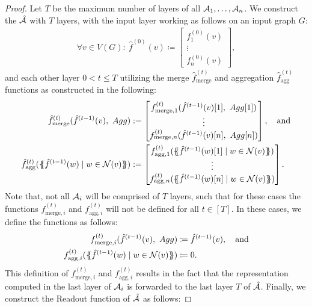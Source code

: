 \begin{proof}
    Let $T$ be the maximum number of layers of all $\mathcal{A}_1, \dots, \mathcal{A}_n$. We construct the \gnn $\hat{\mathcal{A}}$ with $T$ layers, with the input layer working as follows on an input graph $G$:
    \begin{align*}
        \forall v \in V(G): \ \hat{f}^{(0)}(v) \coloneqq \begin{bmatrix}
            f^{(0)}_1(v)\\
            \vdots\\
            f^{(0)}_n(v)
        \end{bmatrix},
    \end{align*}
    and each other layer $0 < t \leq T$ utilizing the merge $\hat{f}^{(t)}_{\text{merge}}$ and aggregation $\hat{f}^{(t)}_{\text{agg}}$ functions as constructed in the following:
    \begin{align*}
        \hat{f}^{(t)}_{\text{merge}} (\hat{f}^{(t-1)}(v), \ Agg) &:= \begin{bmatrix}
            f^{(t)}_{\text{merge}, 1}(\hat{f}^{(t-1)}(v)[1],\ Agg[1])\\
            \vdots\\
            f^{(t)}_{\text{merge}, n}(\hat{f}^{(t-1)}(v)[n],\ Agg[n])
        \end{bmatrix},\quad \text{and}\\
        \hat{f}^{(t)}_{\text{agg}}(\MSopen \hat{f}^{(t-1)}(w) \mid w \in \mathcal{N}(v) \MSclose ) &:= \begin{bmatrix}
            f^{(t)}_{\text{agg}, 1}(\MSopen \hat{f}^{(t-1)}(w)[1] \mid w \in \mathcal{N}(v) \MSclose)\\
            \vdots\\
            f^{(t)}_{\text{agg}, n}(\MSopen \hat{f}^{(t-1)}(w)[n] \mid w \in \mathcal{N}(v) \MSclose)
        \end{bmatrix}.
    \end{align*}
    Note that, not all $\mathcal{A}_i$ will be comprised of $T$ layers, such that for these cases the functions $f^{(t)}_{\text{merge}, i}$ and $f^{(t)}_{\text{agg}, i}$ will not be defined for all $t \in [T]$. In these cases, we define the functions as follows:
    \begin{align*}
        f^{(t)}_{\text{merge}, i}(\hat{f}^{(t-1)}(v), \ Agg) &\coloneqq \hat{f}^{(t-1)}(v), \quad \text{and}\\
        f^{(t)}_{\text{agg}, i}(\{\!\!\{ \hat{f}^{(t-1)}(w) \mid w \in \mathcal{N}(v) \}\!\!\}) &\coloneqq 0.
    \end{align*}
    This definition of $f^{(t)}_{\text{merge}, i}$ and $f^{(t)}_{\text{agg}, i}$ results in the fact that the representation computed in the last layer of $\mathcal{A}_i$ is forwarded to the last layer $T$ of $\hat{\mathcal{A}}$. Finally, we construct the \textsf{Readout} function of $\hat{\mathcal{A}}$ as follows:

\end{proof}
